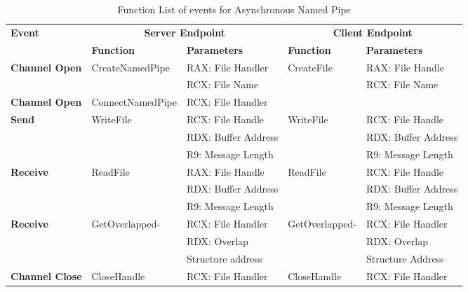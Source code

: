     \begin{table}[H]
        \centering
        \caption{Function List  of events for Asynchronous Named Pipe}
        \label{asynfunctions}
        \begin{tabular}{|l|l|l|l|l|}
            \hline
             \multirow{2}{*}{\textbf{Event}} &
               \multicolumn{2}{c|}{\textbf{Server Endpoint}} &
               \multicolumn{2}{c|}{\textbf{Client Endpoint}} \\
             \cline{2-5}
              & \textbf{Function}& \textbf{Parameters} & \textbf{Function} & \textbf{Parameters}  \\
             \hline
             \multirow{2}{*}{{\textbf{Channel Open}}}
             &\multirow{2}{*}{{CreateNamedPipe}} &  RAX: File Handler & \multirow{2}{*}{CreateFile} &  RAX: File Handle\\
              \cline{3-3} \cline{5-5}
             &&  RCX: File Name &  &  RCX: File Name\\
            \hline
            {{\textbf{Channel Open}}}
             &{ConnectNamedPipe} & {RCX: File Handler} & & \\
            \hline
             \multirow{3}{*}{{\textbf{Send}}}
             &\multirow{3}{*}{WriteFile} &  RCX: File Handle & \multirow{3}{*}{WriteFile} &  RCX: File Handle\\
              \cline{3-3} \cline{5-5}
             &&  RDX: Buffer Address &  &  RDX: Buffer Address\\
                           \cline{3-3} \cline{5-5}
             & &  R9: Message Length &  &  R9: Message Length\\
            \hline
            \multirow{3}{*}{{\textbf{Receive}}}
             & \multirow{3}{*}{ReadFile}&  RAX: File Handle & \multirow{3}{*}{ReadFile} &  RCX: File Handle\\
              \cline{3-3} \cline{5-5}
              &&  RDX: Buffer Address &  &  RDX: Buffer Address\\
                           \cline{3-3} \cline{5-5}
             & &  R9: Message Length &  &  R9: Message Length\\
              \hline
               \multirow{2}{*}{{\textbf{Receive}}}
             & \multirow{2}{*}{GetOverlapped-}&  RCX: File Handler & \multirow{2}{*}{GetOverlapped-} &  RCX: File Handler\\
              \cline{3-3} \cline{5-5}
             &  \multirow{2}{*}{Result} &  RDX:  Overlap  &  \multirow{2}{*}{Result }&  RDX:  Overlap \\
              &  &  Structure address &  &  Structure Address\\
            \hline                       
            \textbf{Channel Close}
             &{CloseHandle} &{RCX: File Handler} & {CloseHandle} &  {RCX: File Handler}\\
            \hline
        \end{tabular}
    \end{table}
    
